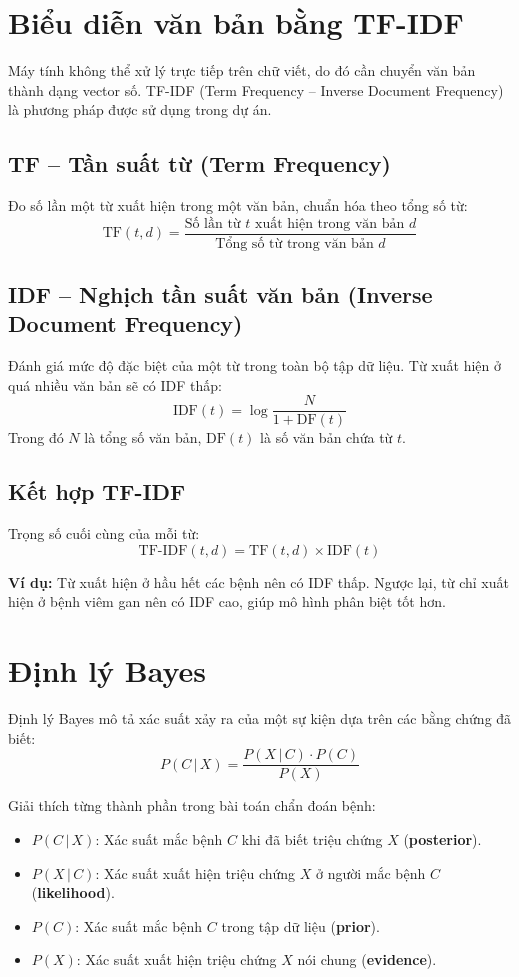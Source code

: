 \documentclass[12pt,a4paper]{report}
\begin{document}
\section{Biểu diễn văn bản bằng TF-IDF}
Máy tính không thể xử lý trực tiếp trên chữ viết, do đó cần chuyển văn bản thành dạng vector số. TF-IDF (Term Frequency -- Inverse Document Frequency) là phương pháp được sử dụng trong dự án.

\subsection{TF -- Tần suất từ (Term Frequency)}
Đo số lần một từ xuất hiện trong một văn bản, chuẩn hóa theo tổng số từ:
\[ \text{TF}(t, d) = \frac{\text{Số lần từ } t \text{ xuất hiện trong văn bản } d}{\text{Tổng số từ trong văn bản } d} \]

\subsection{IDF -- Nghịch tần suất văn bản (Inverse Document Frequency)}
Đánh giá mức độ đặc biệt của một từ trong toàn bộ tập dữ liệu. Từ xuất hiện ở quá nhiều văn bản sẽ có IDF thấp:
\[ \text{IDF}(t) = \log \frac{N}{1 + \text{DF}(t)} \]
Trong đó $N$ là tổng số văn bản, $\text{DF}(t)$ là số văn bản chứa từ $t$.

\subsection{Kết hợp TF-IDF}
Trọng số cuối cùng của mỗi từ:
\[ \text{TF-IDF}(t, d) = \text{TF}(t, d) \times \text{IDF}(t) \]

\textbf{Ví dụ:} Từ  xuất hiện ở hầu hết các bệnh nên có IDF thấp. Ngược lại, từ  chỉ xuất hiện ở bệnh viêm gan nên có IDF cao, giúp mô hình phân biệt tốt hơn.

\section{Định lý Bayes}
Định lý Bayes mô tả xác suất xảy ra của một sự kiện dựa trên các bằng chứng đã biết:
\[ P(C \,|\, X) = \frac{P(X \,|\, C) \cdot P(C)}{P(X)} \]

Giải thích từng thành phần trong bài toán chẩn đoán bệnh:
\begin{itemize}
    \item $P(C \,|\, X)$: Xác suất mắc bệnh $C$ khi đã biết triệu chứng $X$ (\textbf{posterior}).
    \item $P(X \,|\, C)$: Xác suất xuất hiện triệu chứng $X$ ở người mắc bệnh $C$ (\textbf{likelihood}).
    \item $P(C)$: Xác suất mắc bệnh $C$ trong tập dữ liệu (\textbf{prior}).
    \item $P(X)$: Xác suất xuất hiện triệu chứng $X$ nói chung (\textbf{evidence}).
\end{itemize}
\end{document}
